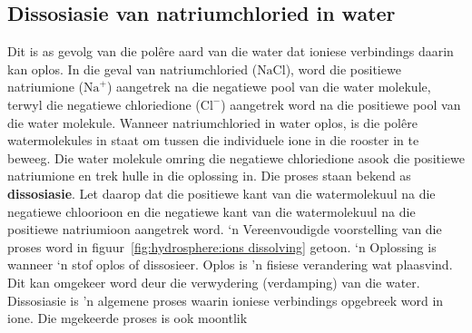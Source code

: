 \subsection*{Dissosiasie van natriumchloried in water}       
Dit is as gevolg van die pol\^{e}re aard van die water dat ioniese verbindings daarin kan oplos. In die geval van natriumchloried ($\text{NaCl}$), word die positiewe natriumione (${\text{Na}}^{+}$) aangetrek na die negatiewe pool van die water molekule, terwyl die negatiewe chloriedione (${\text{Cl}}^{-}$) aangetrek word na die positiewe pool van die water molekule. Wanneer natriumchloried in water oplos, is die polêre watermolekules in staat om tussen die individuele ione in die rooster in te beweeg. Die water molekule omring die negatiewe chloriedione asook die positiewe natriumione en trek hulle in die oplossing in. Die proses staan bekend as \textbf{dissosiasie}. Let daarop dat die positiewe kant van die watermolekuul na die negatiewe chloorioon en die negatiewe kant van die watermolekuul na die positiewe natriumioon aangetrek word. ‘n Vereenvoudigde voorstelling van die proses word in figuur~\ref{fig:hydrosphere:ions dissolving} getoon. ‘n Oplossing is wanneer ‘n stof oplos of dissosieer. Oplos is 'n fisiese verandering wat plaasvind.  Dit kan omgekeer word deur die verwydering (verdamping) van die water.
\label{m38720*fhsst!!!underscore!!!id155}
 {Dissosiasie is 'n algemene proses waarin ioniese verbindings opgebreek word in ione. Die  mgekeerde proses is ook moontlik } 
    \setcounter{subfigure}{0}
